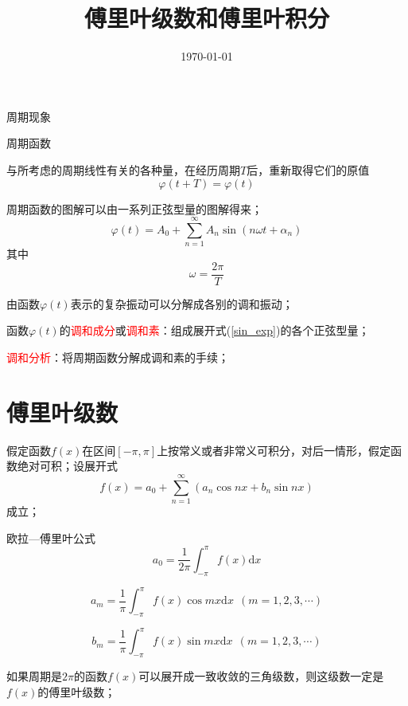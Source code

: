 \documentclass[12pt,a4paper]{article}
\title{傅里叶级数和傅里叶积分}
\author{}
\date{\today}
\newcommand{\dif}{\mathrm{d}}
\begin{document}
\maketitle
周期现象

周期函数

与所考虑的周期线性有关的各种量，在经历周期$T$后，重新取得它们的原值
\begin{equation}
\varphi(t+T) = \varphi(t)
\end{equation}

周期函数的图解可以由一系列正弦型量的图解得来；
\begin{equation}
\varphi(t) = A_0 +\sum_{n=1}^{\infty} A_n \sin(n\omega t +\alpha_n)
\label{sin_exp}
\end{equation}
其中
\begin{equation}
\omega = \frac{2\pi}{T}
\end{equation}

由函数$\varphi(t)$表示的复杂振动可以分解成各别的调和振动；

函数$\varphi(t)$的\textcolor{red}{调和成分}或\textcolor{red}{调和素}：组成展开式(\ref{sin_exp})的各个正弦型量；

\textcolor{red}{调和分析}：将周期函数分解成调和素的手续；

\section{傅里叶级数}
假定函数$f(x)$在区间$[-\pi,\pi]$上按常义或者非常义可积分，对后一情形，假定函数绝对可积；设展开式
\begin{equation}
f(x) = a_0 + \sum_{n=1}^{\infty} (a_n \cos nx +b_n \sin nx)
\end{equation}
成立；

欧拉—傅里叶公式
\begin{equation}
a_0 = \frac{1}{2\pi} \int_{-\pi}^{\pi} f(x) \dif x
\end{equation}

\begin{equation}
a_m = \frac{1}{\pi} \int_{-\pi}^{\pi} f(x) \cos mx \dif x ~~ (m = 1,2,3,\cdots)
\end{equation}

\begin{equation}
b_m = \frac{1}{\pi} \int_{-\pi}^{\pi} f(x) \sin mx \dif x ~~(m = 1,2,3,\cdots)
\end{equation}

如果周期是$2\pi$的函数$f(x)$可以展开成一致收敛的三角级数，则这级数一定是$f(x)$的傅里叶级数；
\end{document}
